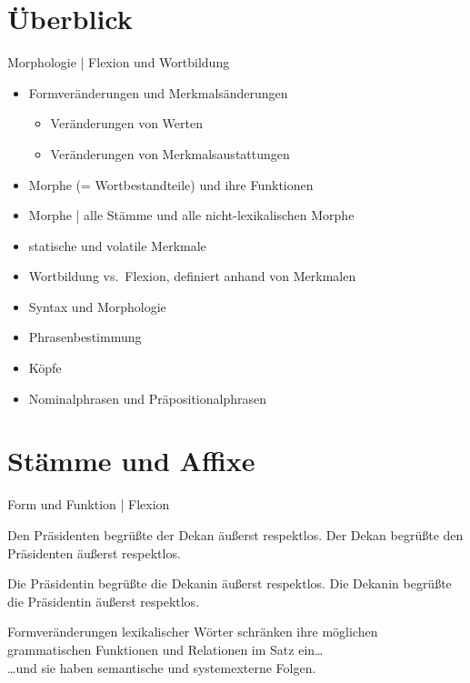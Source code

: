 \section{Überblick}

\begin{frame}
  {Morphologie | Flexion und Wortbildung}
  \pause
  \begin{itemize}[<+->]
    \item \alert{Formveränderungen} und \alert{Merkmalsänderungen}
      \begin{itemize}[<+->]
        \item Veränderungen von Werten
        \item Veränderungen von Merkmalsaustattungen
      \end{itemize}
      \Halbzeile
    \item Morphe (= Wortbestandteile) und ihre Funktionen
    \item Morphe | alle Stämme und alle nicht-lexikalischen Morphe
      \Halbzeile
    \item statische und volatile Merkmale
    \item Wortbildung vs.\ Flexion, definiert anhand von Merkmalen
      \Halbzeile
    \item Syntax und Morphologie
    \item Phrasenbestimmung
    \item Köpfe
    \item Nominalphrasen und Präpositionalphrasen
  \end{itemize}
\end{frame}


\section{Stämme und Affixe}

\begin{frame}
  {Form und Funktion | Flexion}
  \pause
  \begin{exe}
    \ex
    \begin{xlist}
      \ex \alert{Den Präsidenten} begrüßte \alert{der Dekan} äußerst respektlos.
      \pause
      \ex \alert{Der Dekan} begrüßte \alert{den Präsidenten} äußerst respektlos.
    \end{xlist}
    \pause
    \ex
    \begin{xlist}
      \ex \alert{Die Präsidentin} begrüßte \alert{die Dekanin} äußerst respektlos.
      \pause
      \ex \alert{Die Dekanin} begrüßte \alert{die Präsidentin} äußerst respektlos.
    \end{xlist}
  \end{exe}
  \pause
  \Zeile
  Formveränderungen lexikalischer Wörter \alert{schränken ihre möglichen grammatischen Funktionen und Relationen im Satz ein}\dots\\
  \pause
  \Halbzeile
  \dots und sie haben semantische und systemexterne Folgen.

\end{frame}

